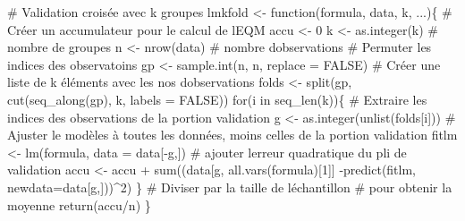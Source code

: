 \documentclass[
  11pt,
  letterpaper,
]{scrbook}
\newenvironment{Shaded}{\begin{snugshade}}{\end{snugshade}}
\newcommand{\AttributeTok}[1]{\textcolor[rgb]{0.40,0.45,0.13}{#1}}
\newcommand{\CommentTok}[1]{\textcolor[rgb]{0.37,0.37,0.37}{#1}}
\newcommand{\ConstantTok}[1]{\textcolor[rgb]{0.56,0.35,0.01}{#1}}
\newcommand{\ControlFlowTok}[1]{\textcolor[rgb]{0.00,0.23,0.31}{#1}}
\newcommand{\DecValTok}[1]{\textcolor[rgb]{0.68,0.00,0.00}{#1}}
\newcommand{\FunctionTok}[1]{\textcolor[rgb]{0.28,0.35,0.67}{#1}}
\newcommand{\NormalTok}[1]{\textcolor[rgb]{0.00,0.23,0.31}{#1}}
\newcommand{\OtherTok}[1]{\textcolor[rgb]{0.00,0.23,0.31}{#1}}
\newcommand{\SpecialCharTok}[1]{\textcolor[rgb]{0.37,0.37,0.37}{#1}}
\theoremstyle{definition}
\theoremstyle{remark}
\begin{document}
\begin{Shaded}
\begin{Highlighting}[]
\CommentTok{\# Validation croisée avec k groupes}
\NormalTok{lmkfold }\OtherTok{\textless{}{-}} \ControlFlowTok{function}\NormalTok{(formula, data, k, ...)\{}
   \CommentTok{\# Créer un accumulateur pour le calcul de l\textquotesingle{}EQM}
\NormalTok{   accu }\OtherTok{\textless{}{-}} \DecValTok{0}
\NormalTok{   k }\OtherTok{\textless{}{-}} \FunctionTok{as.integer}\NormalTok{(k) }\CommentTok{\# nombre de groupes}
\NormalTok{   n }\OtherTok{\textless{}{-}} \FunctionTok{nrow}\NormalTok{(data) }\CommentTok{\# nombre d\textquotesingle{}observations}
   \CommentTok{\# Permuter les indices des observatoins}
\NormalTok{   gp }\OtherTok{\textless{}{-}} \FunctionTok{sample.int}\NormalTok{(n, n, }\AttributeTok{replace =} \ConstantTok{FALSE}\NormalTok{)}
   \CommentTok{\# Créer une liste de k éléments avec les nos d\textquotesingle{}observations}
\NormalTok{   folds }\OtherTok{\textless{}{-}} \FunctionTok{split}\NormalTok{(gp, }\FunctionTok{cut}\NormalTok{(}\FunctionTok{seq\_along}\NormalTok{(gp), k, }\AttributeTok{labels =} \ConstantTok{FALSE}\NormalTok{))}
   \ControlFlowTok{for}\NormalTok{(i }\ControlFlowTok{in} \FunctionTok{seq\_len}\NormalTok{(k))\{}
      \CommentTok{\# Extraire les indices des observations de la portion validation}
\NormalTok{      g }\OtherTok{\textless{}{-}} \FunctionTok{as.integer}\NormalTok{(}\FunctionTok{unlist}\NormalTok{(folds[i]))}
      \CommentTok{\# Ajuster le modèles à toutes les données, moins celles de la portion validation}
\NormalTok{      fitlm }\OtherTok{\textless{}{-}} \FunctionTok{lm}\NormalTok{(formula, }\AttributeTok{data =}\NormalTok{ data[}\SpecialCharTok{{-}}\NormalTok{g,])}
      \CommentTok{\# ajouter l\textquotesingle{}erreur quadratique du pli de validation}
\NormalTok{      accu }\OtherTok{\textless{}{-}}\NormalTok{ accu }\SpecialCharTok{+} \FunctionTok{sum}\NormalTok{((data[g, }\FunctionTok{all.vars}\NormalTok{(formula)[}\DecValTok{1}\NormalTok{]] }\SpecialCharTok{{-}}\FunctionTok{predict}\NormalTok{(fitlm, }\AttributeTok{newdata=}\NormalTok{data[g,]))}\SpecialCharTok{\^{}}\DecValTok{2}\NormalTok{)}
\NormalTok{   \}}
   \CommentTok{\# Diviser par la taille de l\textquotesingle{}échantillon }
   \CommentTok{\# pour obtenir la moyenne}
   \FunctionTok{return}\NormalTok{(accu}\SpecialCharTok{/}\NormalTok{n)}
\NormalTok{\}}


\end{Highlighting}
\end{Shaded}
\end{document}
